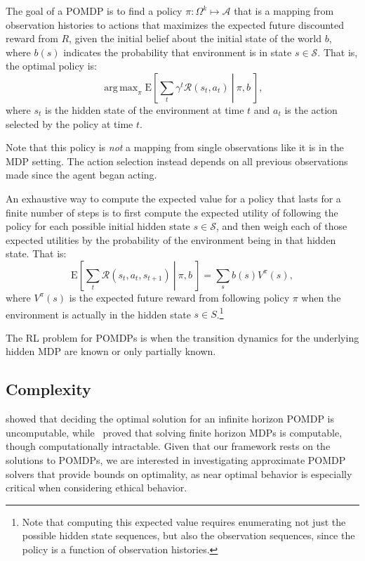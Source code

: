\documentclass[11pt]{article}
\DeclareMathOperator*{\argmax}{arg\,max}
\begin{document}
The goal of a POMDP is to find a policy $\pi : \Omega^k \mapsto \mathcal{A}$ that is a mapping from observation histories to actions that maximizes the expected future discounted reward from $R$, given the initial belief about the initial state of the world $b$, where $b(s)$ indicates the probability that environment is in state $s \in \mathcal{S}$. That is, the optimal policy is:
\begin{equation}
\argmax_\pi \left.\text{E}\left[\sum_t \gamma^t \mathcal{R}(s_t,a_t)\ \right|\ \pi, b\ \right],
\end{equation}
where $s_t$ is the hidden state of the environment at time $t$ and $a_t$ is the action selected by the policy at time $t$. 

Note that this policy is {\em not} a mapping from single observations like it is in the MDP setting. The action selection instead depends on all previous observations made since the agent began acting.

An exhaustive way to compute the expected value for a policy that lasts for a finite number of steps is to first compute the expected utility of following the policy for each possible initial hidden state $s \in \mathcal{S}$, and then weigh each of those expected utilities by the probability of the environment being in that hidden state. That is:
\begin{equation}
\left.\text{E}\left[\sum_t \mathcal{R}(s_t,a_t,s_{t+1})\ \right|\ \pi, b\ \right] = \sum_s b(s) V^\pi(s),
\end{equation}
where $V^\pi(s)$ is the expected future reward from following policy $\pi$ when the environment is actually in the hidden state $s \in S$.\footnote{Note that computing this expected value requires enumerating not just the possible hidden state sequences, but also the observation sequences, since the policy is a function of observation histories.}

The RL problem for POMDPs is when the transition dynamics for the underlying hidden MDP are known or only partially known.

\subsection{Complexity}

\cite{madani1999undecidability} showed that deciding the optimal solution for an infinite horizon POMDP is uncomputable, while~\cite{mundhenk2000complexity} proved that solving finite horizon MDPs is computable, though computationally intractable. Given that our framework rests on the solutions to POMDPs, we are interested in investigating approximate POMDP solvers that provide bounds on optimality, as near optimal behavior is especially critical when considering ethical behavior.
\end{document}
